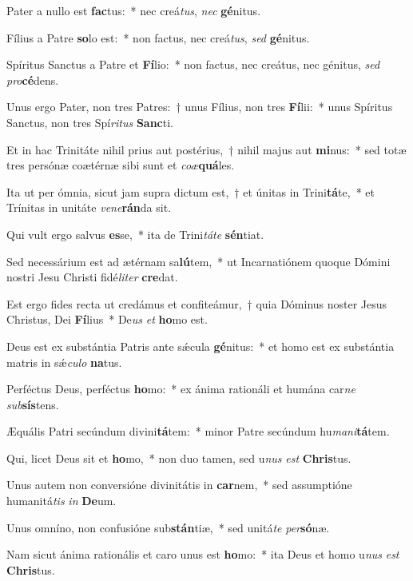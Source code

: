 \item Pater a nullo est \textbf{fac}tus:~* nec creá\textit{tus}, \textit{nec} \textbf{gé}nitus.
\item Fílius a Patre \textbf{so}lo est:~* non factus, nec creá\textit{tus}, \textit{sed} \textbf{gé}nitus.
\item Spíritus Sanctus a Patre et \textbf{Fí}lio:~* non factus, nec creátus, nec génitus, \textit{sed} \textit{pro}\textbf{cé}dens.
\item Unus ergo Pater, non tres Patres:~† unus Fílius, non tres \textbf{Fí}lii:~* unus Spíritus Sanctus, non tres Spí\textit{ri}\textit{tus} \textbf{Sanc}ti.
\item Et in hac Trinitáte nihil prius aut postérius,~† nihil majus aut \textbf{mi}nus:~* sed totæ tres persónæ coætérnæ sibi sunt et \textit{co}\textit{æ}\textbf{quá}les.
\item Ita ut per ómnia, sicut jam supra dictum est,~† et únitas in Trini\textbf{tá}te,~* et Trínitas in unitáte \textit{ve}\textit{ne}\textbf{rán}da sit.
\item Qui vult ergo salvus \textbf{es}se,~* ita de Trini\textit{tá}\textit{te} \textbf{sén}tiat.
\item Sed necessárium est ad ætérnam sa\textbf{lú}tem,~* ut Incarnatiónem quoque Dómini nostri Jesu Christi fidé\textit{li}\textit{ter} \textbf{cre}dat.
\item Est ergo fides recta ut credámus et confiteámur,~† quia Dóminus noster Jesus Christus, Dei \textbf{Fí}lius~* De\textit{us} \textit{et} \textbf{ho}mo est.
\item Deus est ex substántia Patris ante sǽcula \textbf{gé}nitus:~* et homo est ex substántia matris in sǽ\textit{cu}\textit{lo} \textbf{na}tus.
\item Perféctus Deus, perféctus \textbf{ho}mo:~* ex ánima rationáli et humána car\textit{ne} \textit{sub}\textbf{sís}tens.
\item Æquális Patri secúndum divini\textbf{tá}tem:~* minor Patre secúndum hu\textit{ma}\textit{ni}\textbf{tá}tem.
\item Qui, licet Deus sit et \textbf{ho}mo,~* non duo tamen, sed u\textit{nus} \textit{est} \textbf{Chris}tus.
\item Unus autem non conversióne divinitátis in \textbf{car}nem,~* sed assumptióne humanitá\textit{tis} \textit{in} \textbf{De}um.
\item Unus omníno, non confusióne sub\textbf{stán}tiæ,~* sed unitá\textit{te} \textit{per}\textbf{só}næ.
\item Nam sicut ánima rationális et caro unus est \textbf{ho}mo:~* ita Deus et homo u\textit{nus} \textit{est} \textbf{Chris}tus.
